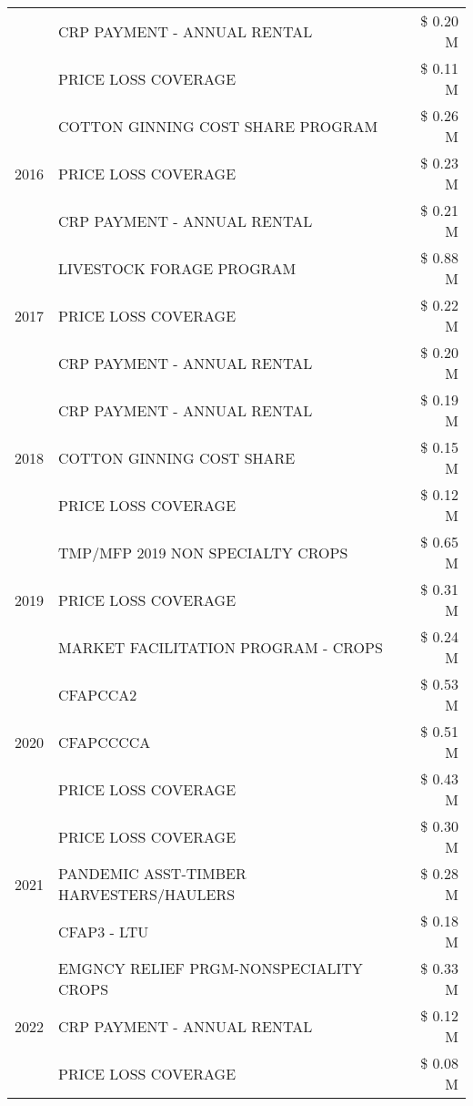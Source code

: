 \begin{tabular}{llr}
 & CRP PAYMENT - ANNUAL RENTAL & \$ 0.20 M \\
 & PRICE LOSS COVERAGE & \$ 0.11 M \\
\cline{1-3}
\multirow[t]{3}{*}{2016} & COTTON GINNING COST SHARE PROGRAM & \$ 0.26 M \\
 & PRICE LOSS COVERAGE & \$ 0.23 M \\
 & CRP PAYMENT - ANNUAL RENTAL & \$ 0.21 M \\
\cline{1-3}
\multirow[t]{3}{*}{2017} & LIVESTOCK FORAGE PROGRAM & \$ 0.88 M \\
 & PRICE LOSS COVERAGE & \$ 0.22 M \\
 & CRP PAYMENT - ANNUAL RENTAL & \$ 0.20 M \\
\cline{1-3}
\multirow[t]{3}{*}{2018} & CRP PAYMENT - ANNUAL RENTAL & \$ 0.19 M \\
 & COTTON GINNING COST SHARE & \$ 0.15 M \\
 & PRICE LOSS COVERAGE & \$ 0.12 M \\
\cline{1-3}
\multirow[t]{3}{*}{2019} & TMP/MFP 2019 NON SPECIALTY CROPS & \$ 0.65 M \\
 & PRICE LOSS COVERAGE & \$ 0.31 M \\
 & MARKET FACILITATION PROGRAM - CROPS & \$ 0.24 M \\
\cline{1-3}
\multirow[t]{3}{*}{2020} & CFAPCCA2 & \$ 0.53 M \\
 & CFAPCCCCA & \$ 0.51 M \\
 & PRICE LOSS COVERAGE & \$ 0.43 M \\
\cline{1-3}
\multirow[t]{3}{*}{2021} & PRICE LOSS COVERAGE & \$ 0.30 M \\
 & PANDEMIC ASST-TIMBER HARVESTERS/HAULERS & \$ 0.28 M \\
 & CFAP3 - LTU & \$ 0.18 M \\
\cline{1-3}
\multirow[t]{3}{*}{2022} & EMGNCY RELIEF PRGM-NONSPECIALITY CROPS & \$ 0.33 M \\
 & CRP PAYMENT - ANNUAL RENTAL & \$ 0.12 M \\
 & PRICE LOSS COVERAGE & \$ 0.08 M \\
\cline{1-3}
\bottomrule
\end{tabular}
